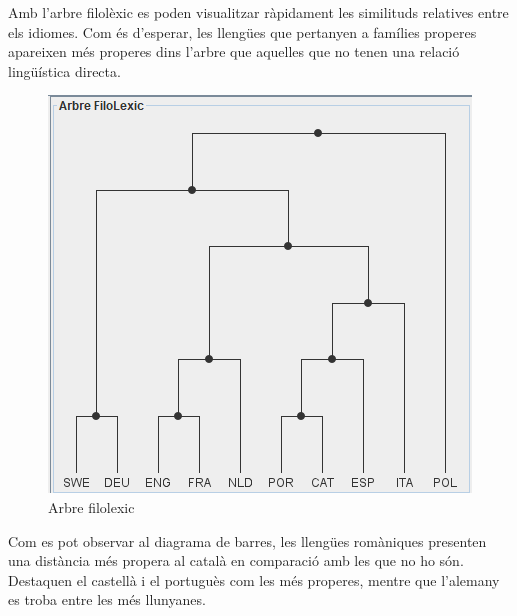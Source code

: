 \documentclass{ieeetj}
\begin{document}
Amb l’arbre filolèxic es poden visualitzar ràpidament les similituds relatives entre els idiomes. Com és d’esperar, les llengües que pertanyen a famílies properes apareixen més properes dins l’arbre que aquelles que no tenen una relació lingüística directa.

\begin{figure}[H]
    \centering
    \includegraphics[width=\linewidth]{png/imagen.png}
    \caption{Arbre filolexic}
    \label{fig:enter-label}
\end{figure}

Com es pot observar al diagrama de barres, les llengües romàniques presenten una distància més propera al català en comparació amb les que no ho són. Destaquen el castellà i el portuguès com les més properes, mentre que l’alemany es troba entre les més llunyanes.
\end{document}
